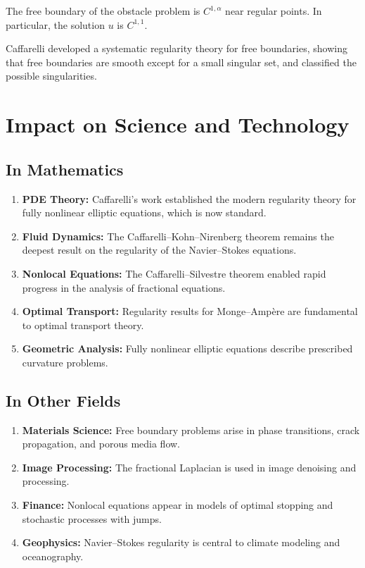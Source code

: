 \begin{theorem}[Caffarelli, 1977]
The free boundary of the obstacle problem is $C^{1,\alpha}$ near regular points. In particular, the solution $u$ is $C^{1,1}$.
\end{theorem}

Caffarelli developed a systematic regularity theory for free boundaries, showing that free boundaries are smooth except for a small singular set, and classified the possible singularities.

\section{Impact on Science and Technology}

\subsection{In Mathematics}

\begin{enumerate}
    \item \textbf{PDE Theory:} Caffarelli's work established the modern regularity theory for fully nonlinear elliptic equations, which is now standard.
    \item \textbf{Fluid Dynamics:} The Caffarelli--Kohn--Nirenberg theorem remains the deepest result on the regularity of the Navier--Stokes equations.
    \item \textbf{Nonlocal Equations:} The Caffarelli--Silvestre theorem enabled rapid progress in the analysis of fractional equations.
    \item \textbf{Optimal Transport:} Regularity results for Monge--Amp\`ere are fundamental to optimal transport theory.
    \item \textbf{Geometric Analysis:} Fully nonlinear elliptic equations describe prescribed curvature problems.
\end{enumerate}

\subsection{In Other Fields}

\begin{enumerate}
    \item \textbf{Materials Science:} Free boundary problems arise in phase transitions, crack propagation, and porous media flow.
    \item \textbf{Image Processing:} The fractional Laplacian is used in image denoising and processing.
    \item \textbf{Finance:} Nonlocal equations appear in models of optimal stopping and stochastic processes with jumps.
    \item \textbf{Geophysics:} Navier--Stokes regularity is central to climate modeling and oceanography.
\end{enumerate}

